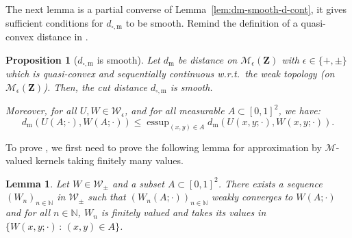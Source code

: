 \documentclass{amsart}
\newcommand{\wrt}{w.r.t.\ }
\theoremstyle{plain}
\newtheorem{lemme}[Th]{Lemma}
\newtheorem{prop}[Th]{Proposition}
\theoremstyle{definition}
\newcommand{\Space}{\mathbf{Z}}
\newcommand{\signed}{\pm}
\newcommand{\cM}{\mathcal{M}}
\newcommand{\MeasEps}{\mathcal{M}_{\epsilon}(\Space)}
\newcommand{\Kernel}{\mathcal{W}_{\signed}}
\newcommand{\KernelEps}{\mathcal{W}_{\epsilon}}
\newcommand{\m}{\mathrm{m}}
\newcommand{\dmeas}{d_\m}
\newcommand{\dcut}{d_{\square,\m}}
\newcommand{\N}{\mathbb{N}}
\DeclareMathOperator*{\esssup}{\mathrm{essup}}
\begin{document}
The next lemma is a partial converse of Lemma~\ref{lem:dm-smooth-d-cont},
it gives sufficient conditions for $\dcut$ to be smooth.
Remind the definition of a quasi-convex distance in .


\begin{prop}[$\dcut$ is smooth]
	\label{prop_dcut_smooth}
Let $\dmeas$ be distance on $\MeasEps$ with $\epsilon\in\{ +, \pm\}$
	which is quasi-convex and sequentially continuous \wrt the weak topology (on $\MeasEps$).
Then, the cut distance $\dcut$ is smooth.

Moreover, for all $U,W \in \KernelEps$, and for all measurable $A\subset [0,1]^2$, we have:
\begin{equation}\label{eq_dcut_bound_esssup}
\dmeas(U(A;\cdot),W(A;\cdot)) \leq \esssup_{(x,y)\in A} \dmeas(U(x,y;\cdot), W(x,y;\cdot)).
\end{equation}
\end{prop}

To prove , we first need to prove the following lemma
	for approximation by $\cM$-valued kernels taking finitely many values.

\begin{lemme}\label{lemme_finite_values_approx}
Let $W\in\Kernel$ and a subset $A\subset [0,1]^2$. 
There exists a sequence $(W_n)_{n\in\N}$ in $\Kernel$
such that $(W_n(A;\cdot))_{n\in\N}$ weakly converges to $W(A;\cdot)$
and for all $n\in\N$, $W_n$ is finitely valued and takes its values in
	$\{ W(x,y;\cdot) \, : \, (x,y)\in A \}$.
\end{lemme}
\end{document}
